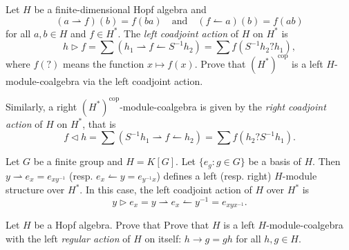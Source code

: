 \documentclass[12pt]{amsproc}
\begin{document}
\begin{exercise}
Let $H$ be a finite-dimensional Hopf algebra and 
\[
(a\rightharpoonup f)(b)=f(ba)
\quad\text{and}\quad 
(f\leftharpoonup a)(b)=f(ab)
\]
for all $a,b\in H$ and $f\in H^{*}$. The \emph{left coadjoint action}
of $H$ on $H^{*}$ is 
\[
h\triangleright f=\sum (h_{1}\rightharpoonup f\leftharpoonup S^{-1}h_{2})=\sum f(S^{-1}h_{2}?h_1),
\]
where $f(?)$ means the function $x\mapsto f(x)$. Prove that
$(H^*)^\mathrm{cop}$ is a left $H$-module-coalgebra via the left coadjoint
action. 
\end{exercise}

Similarly,  a right $(H^*)^\mathrm{cop}$-module-coalgebra is given by the \emph{right coadjoint action} of $H$ on $H^{*}$, that is
\[
f\triangleleft h=\sum (S^{-1}h_{1}\rightharpoonup f\leftharpoonup h_{2})=\sum f(h_2?S^{-1}h_{1}).
\]

\begin{example}
Let $G$ be a finite group and $H=K[G]$. Let $\{e_g:g\in G\}$ be a basis of $H$. Then 
$y\rightharpoonup e_{x}=e_{xy^{-1}}$ (resp. $e_{x}\leftharpoonup
y=e_{y^{-1}x}$) defines a left (resp. right) $H$-module structure over $H^{*}$. In this case, 
the left coadjoint action of $H$ over $H^{*}$ is 
\[
y\triangleright e_{x}=y\rightharpoonup e_{x}\leftharpoonup y^{-1}=e_{xyx^{-1}}.
\]
\end{example}

\begin{exercise}
Let $H$ be a Hopf algebra. Prove that 
Prove that $H$ is a left $H$-module-coalgebra with 
the left \emph{regular action} of $H$ on itself:
$h\rightarrow g=gh$ for all
$h,g\in H$. 
\end{exercise}

\end{document}
